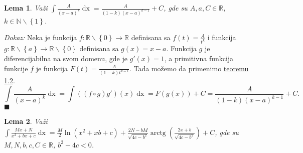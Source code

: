 \documentclass{article}
\newtheorem{lema}{Lema}[section]
\DeclareMathOperator{\arctg}{arctg}
\DeclareMathOperator{\dx}{dx}
\begin{document}
\begin{lemabox}
    \label{lema_1.2}
    \begin{lema}
        Važi $\displaystyle\int \frac{A}{\left(x-a\right)^k}\dx=\frac{A}{\left(1-k\right)\left(x-a\right)^{k-1}}+ C$, gde su $A,a,C\in \mathbb{R}$, $k\in\mathbb{N}\backslash\left\{1\right\}$.
    \end{lema}
\end{lemabox}

\textit{Dokaz:} Neka je funkcija $f:\mathbb{R}\backslash\left\{0\right\}\longrightarrow\mathbb{R}$ definisana sa
$f\left(t\right)=\frac{A}{t^k}$ i funkcija $g:\mathbb{R}\backslash\left\{a\right\}\longrightarrow\mathbb{R}\backslash\left\{0\right\}$
definisana sa $g\left(x\right)=x-a$. Funkcija $g$ je diferencijabilna na svom domenu, gde je $g'\left(x\right)=1$, a primitivna funkcija
funkcije $f$ je funkcija $F\left(t\right)=\frac{A}{\left(1-k\right)t^{k-1}}$. Tada možemo da primenimo \hyperref[teorema_1.2]{teoremu 1.2}.
$$\int \frac{A}{\left(x-a\right)^k}\dx = \int \left(\left(f\circ g\right) g'\right)\left(x\right)\dx = F\left(g\left(x\right)\right) + C= \frac{A}{\left(1-k\right)\left(x-a\right)^{k-1}}+ C.$$
\null\hfill$\blacksquare$\par

\begin{lemabox}
    \label{lema_1.3}
    \begin{lema}
        Važi $\displaystyle\int \frac{Mx+N}{x^2+bx+c}\dx= \frac{M}{2}\ln\left(x^2+xb+c\right)+\frac{2N-bM}{\sqrt{4c-b^2}}\arctg\left({\frac{2x+b}{\sqrt{4c-b^2}}}\right)+ C$, gde su $M,N,b,c,C\in\mathbb{R}$, $b^2 - 4c < 0$.
    \end{lema}
\end{lemabox}
\end{document}
